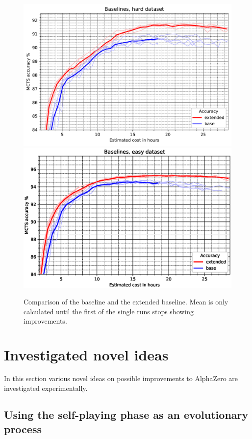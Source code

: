 \documentclass[12pt,onecolumn,oneside,titlepage]{article}
\begin{document}
\begin{figure}[H]
\centering
\includegraphics[clip,width=\columnwidth]{baseline_ex}
\includegraphics[clip,width=\columnwidth]{baseline_ex_easy_dataset}
\caption{Comparison of the baseline and the extended baseline. Mean is only calculated until the first of the single runs stops showing improvements.}
\label{fig:baseline_compare}
\end{figure}


\section{Investigated novel ideas}\label{s:novel_ideas}

In this section various novel ideas on possible improvements to AlphaZero are investigated experimentally.

\subsection{Using the self-playing phase as an evolutionary process} \label{s:novel_evolution}
\end{document}
